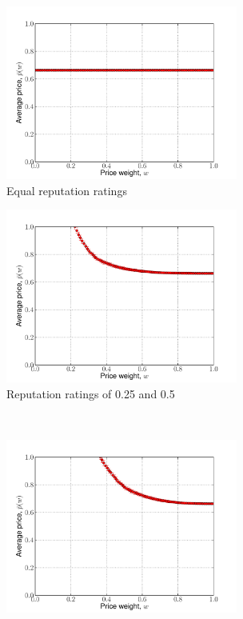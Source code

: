 \begin{figure}[htp]
	\caption{FIX:ME Caption}
	\label{fig:expected_prices}
	\vspace{0.5cm}
	\begin{subfigure}[b]{0.5\textwidth}
	  \includegraphics[width=3in]{2/Figures/expected_prices_equal}
	  \caption{Equal reputation ratings}
	  \label{fig:expected_prices_equal}
	\end{subfigure}
	\begin{subfigure}[b]{0.5\textwidth}
	  \includegraphics[width=3in]{2/Figures/expected_prices_025_05}
	  \caption{Reputation ratings of 0.25 and 0.5}
	  \label{fig:expected_prices_025_05}
	\end{subfigure}
	\vspace{0.5cm}\\
	\begin{subfigure}[b]{0.5\textwidth}
	  \includegraphics[width=3in]{2/Figures/expected_prices_025_075}

\end{subfigure}
\end{figure}
